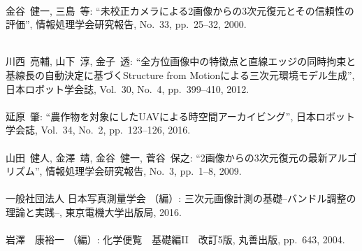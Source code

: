 \begin{mythebibliography}{}
\leavevmode \\金谷~健一, 三島~等:
\newblock ``未校正カメラによる2画像からの3次元復元とその信頼性の評価'',
\newblock 情報処理学会研究報告, No.~33, pp.~25--32, 2000.
\\

\newpage

\leavevmode \\川西~亮輔, 山下~淳, 金子~透:
\newblock ``全方位画像中の特徴点と直線エッジの同時拘束と基線長の自動決定に基づくStructure from Motionによる三次元環境モデル生成'',
\newblock 日本ロボット学会誌, Vol.~30, No.~4, pp.~399--410, 2012.
\\

\leavevmode \\延原~肇:
\newblock ``農作物を対象にしたUAVによる時空間アーカイビング'',
\newblock 日本ロボット学会誌, Vol.~34, No.~2, pp.~123--126, 2016.
\\

\leavevmode \\山田~健人, 金澤~靖, 金谷~健一, 菅谷~保之:
\newblock ``2画像からの3次元復元の最新アルゴリズム'',
\newblock 情報処理学会研究報告, No.~3, pp.~1--8, 2009.
\\

\leavevmode \\一般社団法人 日本写真測量学会 （編）:
\newblock 三次元画像計測の基礎--バンドル調整の理論と実践--,
\newblock 東京電機大学出版局, 2016.
\\

\leavevmode \\岩澤　康裕一 （編）:
\newblock 化学便覧　基礎編I\hspace{-.1em}I　改訂5版,
\newblock 丸善出版, pp.~643, 2004.
\\

%
%

%
%


\end{mythebibliography}
